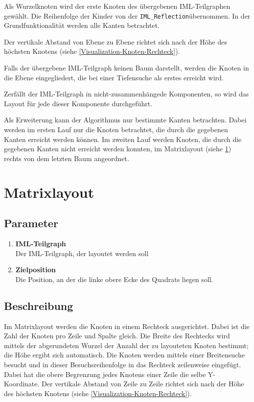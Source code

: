 Als Wurzelknoten wird der erste Knoten des \"ubergebenen IML-Teilgraphen gew\"ahlt. Die Reihenfolge der Kinder von der \texttt{IML\_Reflection}\xspace\"ubernommen. In der Grundfunktionalit\"at werden alle Kanten betrachtet.

Der vertikale Abstand von Ebene zu Ebene richtet sich nach der H\"ohe des h\"ochsten Knotens (siehe \ref{Visualization-Knoten-Rechteck}).

Falls der \"ubergebene IML-Teilgraph keinen Baum darstellt, werden die Knoten in die Ebene eingegliedert, die bei einer Tiefensuche als erstes erreicht wird.

Zerf\"allt der IML-Teilgraph in nicht-zusammenh\"angede Komponenten, so wird das Layout f\"ur jede dieser Komponente durchgef\"uhrt.

Als Erweiterung kann der Algorithmus nur bestimmte Kanten betrachten. Dabei werden im ersten Lauf nur die Knoten betrachtet, die durch die gegebenen Kanten erreicht werden k\"onnen.
Im zweiten Lauf werden Knoten, die durch die gegebenen Kanten nicht erreicht werden konnten, im Matrixlayout (siehe \ref{Matrixlayout}) rechts von dem letzten Baum angeordnet.

\section{Matrixlayout}
\label{Matrixlayout}
\subsection{Parameter}
\begin{enumerate}
  \item \textbf{IML-Teilgraph}\\
Der IML-Teilgraph, der layoutet werden soll
  \item \textbf{Zielposition}\\
Die Position, an der die linke obere Ecke des Quadrats liegen soll.
\end{enumerate}

\subsection{Beschreibung}
Im Matrixlayout werden die Knoten in einem Rechteck ausgerichtet.
Dabei ist die Zahl der Knoten pro Zeile und Spalte gleich.  Die Breite
des Rechtecks wird mittels der abgerundeten Wurzel der Anzahl der zu
layouteten Knoten bestimmt; die H\"ohe ergibt sich automatisch.  Die
Knoten werden mittels einer Breitensuche besucht und in dieser
Besuchsreihenfolge in das Rechteck zeilenweise eingef\"ugt. Dabei hat
die obere Begrenzung jedes Knotens einer Zeile die selbe Y-Koordinate.
Der vertikale Abstand von Zeile zu Zeile richtet sich nach der H\"ohe
des h\"ochsten Knotens (siehe \ref{Visualization-Knoten-Rechteck}).

